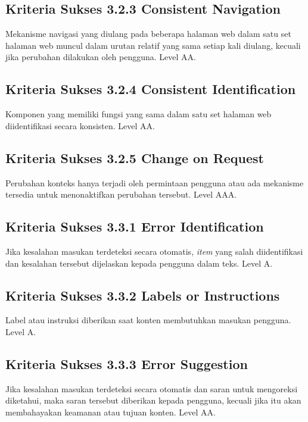 \subsection{Kriteria Sukses 3.2.3 Consistent Navigation}
\label{sec:kriteria_3.2.3}
Mekanisme navigasi yang diulang pada beberapa halaman web dalam satu set halaman web muncul dalam urutan relatif yang sama setiap kali diulang, kecuali jika perubahan dilakukan oleh pengguna.
Level AA.

\subsection{Kriteria Sukses 3.2.4 Consistent Identification}
\label{sec:kriteria_3.2.4}
Komponen yang memiliki fungsi yang sama dalam satu set halaman web diidentifikasi secara konsisten.
Level AA.

\subsection{Kriteria Sukses 3.2.5 Change on Request}
\label{sec:kriteria_3.2.5}
Perubahan konteks hanya terjadi oleh permintaan pengguna atau ada mekanisme tersedia untuk menonaktifkan perubahan tersebut.
Level AAA.

\subsection{Kriteria Sukses 3.3.1 Error Identification}
\label{sec:kriteria_3.3.1}
Jika kesalahan masukan terdeteksi secara otomatis, \textit{item} yang salah diidentifikasi dan kesalahan tersebut dijelaskan kepada pengguna dalam teks.
Level A.

\subsection{Kriteria Sukses 3.3.2 Labels or Instructions}
\label{sec:kriteria_3.3.2}
Label atau instruksi diberikan saat konten membutuhkan masukan pengguna.
Level A.

\subsection{Kriteria Sukses 3.3.3 Error Suggestion}
\label{sec:kriteria_3.3.3}
Jika kesalahan masukan terdeteksi secara otomatis dan saran untuk mengoreksi diketahui, maka saran tersebut diberikan kepada pengguna, kecuali jika itu akan membahayakan keamanan atau tujuan konten.
Level AA.

